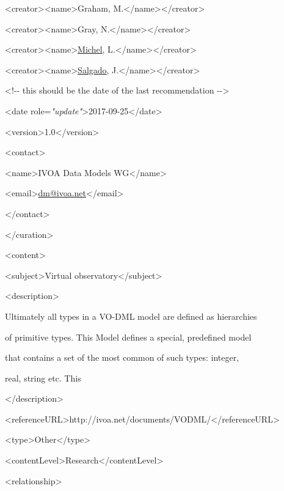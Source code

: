 \documentclass[10pt,a4paper]{ivoa}
\begin{document}
\textless creator\textgreater\textless name\textgreater Graham,
M.\textless/name\textgreater\textless/creator\textgreater{}

\textless creator\textgreater\textless name\textgreater Gray,
N.\textless/name\textgreater\textless/creator\textgreater{}

\textless creator\textgreater\textless name\textgreater{}\uline{Michel},
L.\textless/name\textgreater\textless/creator\textgreater{}

\textless creator\textgreater\textless name\textgreater{}\uline{Salgado},
J.\textless/name\textgreater\textless/creator\textgreater{}

\textless!-\/- this should be the date of the last recommendation
-\/-\textgreater{}

\textless date
role=\emph{"update"}\textgreater2017-09-25\textless/date\textgreater{}

\textless version\textgreater1.0\textless/version\textgreater{}

\textless contact\textgreater{}

\textless name\textgreater IVOA Data Models
WG\textless/name\textgreater{}

\textless email\textgreater{}\uline{dm@ivoa.net}\textless/email\textgreater{}

\textless/contact\textgreater{}

\textless/curation\textgreater{}

\textless content\textgreater{}

\textless subject\textgreater Virtual
observatory\textless/subject\textgreater{}

\textless description\textgreater{}

Ultimately all types in a VO-DML model are defined as hierarchies

of primitive types. This Model defines a special, predefined model

that contains a set of the most common of such types: integer,

real, string etc. This

\textless/description\textgreater{}

\textless referenceURL\textgreater http://ivoa.net/documents/VODML/\textless/referenceURL\textgreater{}

\textless type\textgreater Other\textless/type\textgreater{}

\textless contentLevel\textgreater Research\textless/contentLevel\textgreater{}

\textless relationship\textgreater{}
\end{document}
